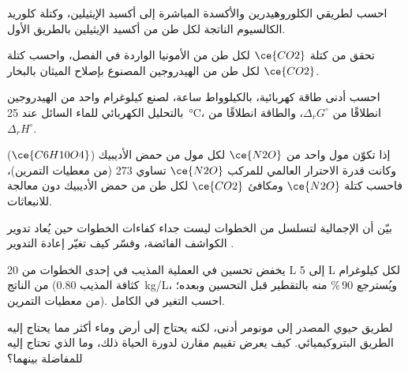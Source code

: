 \begin{exercise}[$\star\star$]\label{exo:b3:green-industrial:6}
احسب  لطريقي الكلوروهيدرين والأكسدة المباشرة إلى
أكسيد الإيثيلين، وكتلة كلوريد الكالسيوم الناتجة لكل طن من أكسيد الإيثيلين
بالطريق الأول.
\end{exercise}

\begin{exercise}[$\star\star$]\label{exo:b3:green-industrial:7}
تحقق من كتلة $\ce{CO2}$ لكل طن من الأمونيا الواردة في الفصل، واحسب كتلة $\ce{CO2}$ لكل طن من
الهيدروجين المصنوع بإصلاح الميثان بالبخار.
\end{exercise}

\begin{exercise}[$\star\star$]\label{exo:b3:green-industrial:8}
احسب أدنى طاقة كهربائية، بالكيلوواط ساعة، لصنع كيلوغرام واحد من الهيدروجين
بالتحليل الكهربائي للماء السائل عند \qty{25}{\celsius}، انطلاقًا من $\Delta_rG^\circ$، والطاقة انطلاقًا من $\Delta_rH^\circ$.
\end{exercise}

\begin{exercise}[$\star\star$]\label{exo:b3:green-industrial:9}
إذا تكوّن مول واحد من $\ce{N2O}$ لكل مول من حمض الأديبيك ($\ce{C6H10O4}$) وكانت قدرة الاحترار
العالمي للمركب $\ce{N2O}$ تساوي 273 (من معطيات التمرين)، فاحسب كتلة $\ce{N2O}$ ومكافئ $\ce{CO2}$
لكل طن من حمض الأديبيك دون معالجة للانبعاثات.
\end{exercise}

\begin{exercise}[$\star\star\star$]\label{exo:b3:green-industrial:10}
بيّن أن  الإجمالية لتسلسل من الخطوات ليست جداء كفاءات
الخطوات حين يُعاد تدوير الكواشف الفائضة، وفسّر كيف تغيّر إعادة التدوير
.
\end{exercise}

\begin{exercise}[$\star\star\star$]\label{exo:b3:green-industrial:11}
يخفض تحسين في العملية المذيب في إحدى الخطوات من 20 L إلى 5 L لكل كيلوغرام من
الناتج (كثافة المذيب \qty{0.80}{kg/L}، ويُسترجع 90\,\% منه بالتقطير قبل التحسين وبعده؛ من معطيات
التمرين). احسب التغير في  الكامل.
\end{exercise}

\begin{exercise}[$\star\star\star$]\label{exo:b3:green-industrial:12}
لطريق حيوي المصدر إلى مونومر  أدنى، لكنه يحتاج إلى أرض
وماء أكثر مما يحتاج إليه الطريق البتروكيميائي. كيف يعرض تقييم مقارن لدورة الحياة ذلك،
وما الذي تحتاج إليه للمفاضلة بينهما؟
\end{exercise}

